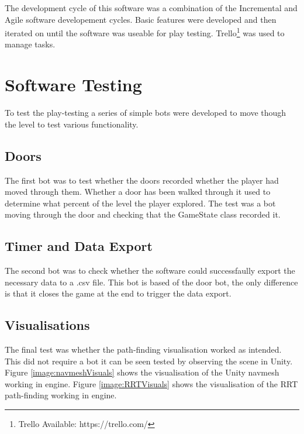 \documentclass[journal]{IEEEtran}
\begin{document}
The development cycle of this software was a combination of the Incremental and Agile software developement cycles. Basic features were developed and then iterated on until the software was useable for play testing. Trello\footnote[5]{Trello Available: https://trello.com/} was used to manage tasks.

\section{Software Testing} \label{softtest}
To test the play-testing a series of simple bots were developed to move though the level to test various functionality.


\subsection{Doors}
The first bot was to test whether the doors recorded whether the player had moved through them. Whether a door has been walked through it used to determine what percent of the level the player explored.
The test was a bot moving through the door and checking that the GameState class recorded it.


\subsection{Timer and Data Export}
The second bot was to check whether the software could successfaully export the necessary data to a .csv file. This bot is based of the door bot, the only difference is that it closes the game at the end to trigger the data export.  


\subsection{Visualisations}
The final test was whether the path-finding visualisation worked as intended. This did not require a bot it can be seen tested by observing the scene in Unity. Figure \ref{image:navmeshVisuals} shows the visualisation of the Unity navmesh working in engine.  Figure \ref{image:RRTVisuals} shows the visualisation of the RRT path-finding working in engine.
\end{document}
